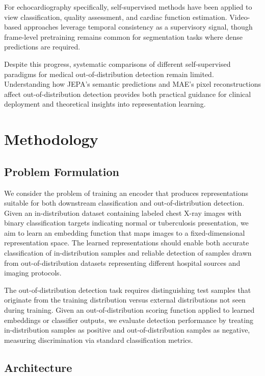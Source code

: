 \documentclass[11pt,a4paper]{article}
\begin{document}
For echocardiography specifically, self-supervised methods have been applied to view classification, quality assessment, and cardiac function estimation. Video-based approaches leverage temporal consistency as a supervisory signal, though frame-level pretraining remains common for segmentation tasks where dense predictions are required.

Despite this progress, systematic comparisons of different self-supervised paradigms for medical out-of-distribution detection remain limited. Understanding how JEPA's semantic predictions and MAE's pixel reconstructions affect out-of-distribution detection provides both practical guidance for clinical deployment and theoretical insights into representation learning.

\section{Methodology}

\subsection{Problem Formulation}

We consider the problem of training an encoder that produces representations suitable for both downstream classification and out-of-distribution detection. Given an in-distribution dataset containing labeled chest X-ray images with binary classification targets indicating normal or tuberculosis presentation, we aim to learn an embedding function that maps images to a fixed-dimensional representation space. The learned representations should enable both accurate classification of in-distribution samples and reliable detection of samples drawn from out-of-distribution datasets representing different hospital sources and imaging protocols.

The out-of-distribution detection task requires distinguishing test samples that originate from the training distribution versus external distributions not seen during training. Given an out-of-distribution scoring function applied to learned embeddings or classifier outputs, we evaluate detection performance by treating in-distribution samples as positive and out-of-distribution samples as negative, measuring discrimination via standard classification metrics.

\subsection{Architecture}
\end{document}
